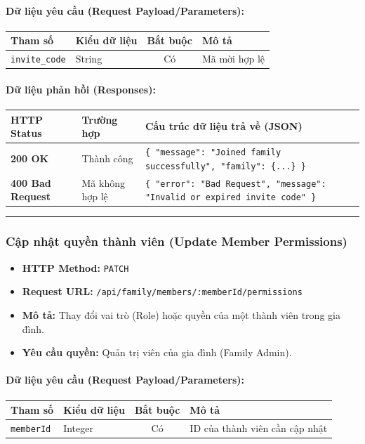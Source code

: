 \documentclass[12pt,a4paper]{article}
\begin{document}
\paragraph{Dữ liệu yêu cầu (Request Payload/Parameters):}
\begin{longtable}{|p{2.8cm}|p{2.2cm}|c|p{7.0cm}|}
\hline
\textbf{Tham số} & \textbf{Kiểu dữ liệu} & \textbf{Bắt buộc} & \textbf{Mô tả} \\ \hline
\endhead
\texttt{invite\_code} & String & Có & Mã mời hợp lệ \\ \hline
\end{longtable}

\paragraph{Dữ liệu phản hồi (Responses):}
\begin{longtable}{|p{2.8cm}|p{3.2cm}|p{8.0cm}|}
\hline
\textbf{HTTP Status} & \textbf{Trường hợp} & \textbf{Cấu trúc dữ liệu trả về (JSON)} \\ \hline
\endhead
\textbf{200 OK} & Thành công & \texttt{\{ "message": "Joined family successfully", "family": \{...\} \}} \\ \hline
\textbf{400 Bad Request} & Mã không hợp lệ & \texttt{\{ "error": "Bad Request", "message": "Invalid or expired invite code" \}} \\ \hline
\end{longtable}

\vskip 0.4cm
\noindent\rule{\textwidth}{0.3pt}
\vskip 0.4cm

\subsubsection{Cập nhật quyền thành viên (Update Member Permissions)}
\begin{itemize}[leftmargin=*]
    \item \textbf{HTTP Method:} \texttt{PATCH}
    \item \textbf{Request URL:} \texttt{/api/family/members/:memberId/permissions}
    \item \textbf{Mô tả:} Thay đổi vai trò (Role) hoặc quyền của một thành viên trong gia đình.
    \item \textbf{Yêu cầu quyền:} Quản trị viên của gia đình (Family Admin).
\end{itemize}

\paragraph{Dữ liệu yêu cầu (Request Payload/Parameters):}
\begin{longtable}{|p{2.8cm}|p{2.2cm}|c|p{7.0cm}|}
\hline
\textbf{Tham số} & \textbf{Kiểu dữ liệu} & \textbf{Bắt buộc} & \textbf{Mô tả} \\ \hline
\endhead
\texttt{memberId} & Integer & Có & ID của thành viên cần cập nhật \\ \hline
\end{longtable}
\end{document}

